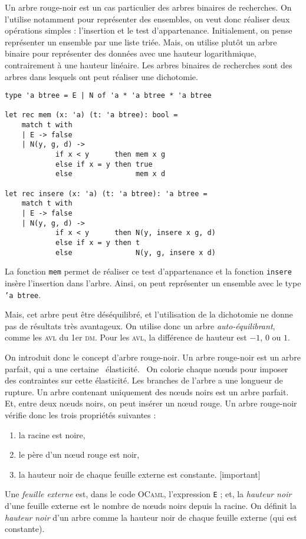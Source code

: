 \documentclass[a4paper]{article}
\begin{document}
	Un arbre rouge-noir est un cas particulier des arbres binaires de recherches.
	On l'utilise notamment pour représenter des ensembles, on veut donc réaliser deux opérations simples : l'insertion et le test d'appartenance.
	Initialement, on pense représenter un ensemble par une liste triée.
	Mais, on utilise plutôt un arbre binaire pour représenter des données avec une hauteur logarithmique, contrairement à une hauteur linéaire.
	Les arbres binaires de recherches sont des arbres dans lesquels ont peut réaliser une dichotomie.
	\begin{lstlisting}[language=caml,caption=Arbre binaire de recherche]
type 'a btree = E | N of 'a * 'a btree * 'a btree

let rec mem (x: 'a) (t: 'a btree): bool =
	match t with
	| E -> false
	| N(y, g, d) ->
			if x < y      then mem x g
			else if x = y then true
			else               mem x d

let rec insere (x: 'a) (t: 'a btree): 'a btree =
	match t with
	| E -> false
	| N(y, g, d) ->
			if x < y      then N(y, insere x g, d)
			else if x = y then t
			else               N(y, g, insere x d)
	\end{lstlisting}
	La fonction \texttt{mem} permet de réaliser ce test d'appartenance et la fonction \texttt{insere} insère l'insertion dans l'arbre.
	Ainsi, on peut représenter un ensemble avec le type \texttt{'a btree}.

	Mais, cet arbre peut être déséquilibré, et l'utilisation de la dichotomie ne donne pas de résultats très avantageux.
	On utilise donc un arbre \textit{auto-équilibrant}, comme les \textsc{avl} du 1er \textsc{dm}. Pour les \textsc{avl}, la différence de hauteur est $-1$, $0$ ou $1$.

	On introduit donc le concept d'arbre rouge-noir.
	Un arbre rouge-noir est un arbre parfait, qui a une certaine \guillemotleft~élasticité.~\guillemotright\@
	On colorie chaque nœuds pour imposer des contraintes sur cette élasticité.
	Les branches de l'arbre a une longueur de rupture.
	Un arbre contenant uniquement des nœuds noirs est un arbre parfait.
	Et, entre deux nœuds noirs, on peut insérer un nœud rouge.
	Un arbre rouge-noir vérifie donc les trois propriétés suivantes :
	\begin{enumerate}[label=(\textit{\alph*})]
		\item la racine est noire,
		\item le père d'un nœud rouge est noir,
		\item la hauteur noir de chaque feuille externe est constante. \hfill [important]
	\end{enumerate}
	Une \textit{feuille externe} est, dans le code \textsc{OCaml}, l'expression \texttt{E} ; et, la \textit{hauteur noir} d'une feuille externe est le nombre de nœuds noirs depuis la racine.
	On définit la \textit{hauteur noir} d'un arbre comme la hauteur noir de chaque feuille externe (qui est constante).
\end{document}
